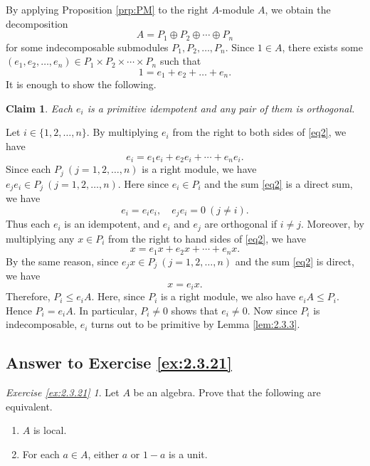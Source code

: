\documentclass{surv-l}
\numberwithin{equation}{chapter}
\numberwithin{figure}{chapter}
\theoremstyle{plain}
\newtheorem*{clm-nn}{Claim}
\theoremstyle{definition}
\theoremstyle{remark}
\begin{document}
By applying Proposition \ref{prp:PM} to the right $A$-module $A$,
we obtain the decomposition
\begin{equation*}
A = P_1 \oplus P_2 \oplus \cdots \oplus P_n
\end{equation*}
for some indecomposable submodules $P_1, P_2, \dots, P_n$.
Since $1 \in A$, there exists some $(e_1, e_2, \dots, e_n) \in P_1 \times P_2 \times \cdots \times P_n$
such that
\begin{equation}\label{eq2}
1 = e_1 + e_2 + \dots + e_n.
\end{equation}
It is enough to show the following.
\begin{clm-nn}
Each $e_i$ is a primitive idempotent and any pair of them is orthogonal.
\end{clm-nn}
Let $i \in \{1,2,\dots, n\}$.
By multiplying $e_i$ from the right to both sides of \eqref{eq2},
we have
\begin{equation*}
e_i = e_1e_i + e_2e_i + \cdots + e_ne_i.
\end{equation*}
Since each $P_j \ (j= 1,2,\dots, n)$ is a right module, we have
$e_je_i \in P_j \ (j = 1,2,\dots, n)$.
Here since $e_i \in P_i$ and the sum \eqref{eq2} is a direct sum, we have
\begin{equation*}
e_i = e_ie_i, \quad e_je_i = 0 \ (j \ne i).
\end{equation*}
Thus each $e_i$ is an idempotent, and $e_i$ and $e_j$ are orthogonal if $i \ne j$.
Moreover, by multiplying any $x \in P_i$ from the right to hand sides of
\eqref{eq2}, we have
\begin{equation*}
x = e_1x + e_2x + \cdots + e_nx.
\end{equation*}
By the same reason,
since $e_jx \in P_j \ (j =1,2,\dots,n)$ and the sum \eqref{eq2} is direct, we have
\begin{equation*}
x = e_i x.
\end{equation*}
Therefore, $P_i \le e_iA$.
Here, since $P_i$ is a right module, we also have $e_iA \le P_i$.
Hence $P_i = e_iA$.
In particular, $P_i \ne 0$ shows that $e_i \ne 0$.
Now since $P_i$ is indecomposable, $e_i$ turns out to be primitive
by Lemma \ref{lem:2.3.3}.

\subsection{Answer to Exercise \protect\ref{ex:2.3.21}}\label{sec:exc2.3.21}
\newtheorem*{exc21}{Exercise \ref{ex:2.3.21}}
\begin{exc21}
Let $A$ be an algebra.
Prove that the following are equivalent.
\begin{enumerate}
\item
$A$ is local.
\item
For each  $a \in A$, either $a$ or $1-a$ is a unit.
\end{enumerate}
\end{exc21}
\end{document}
